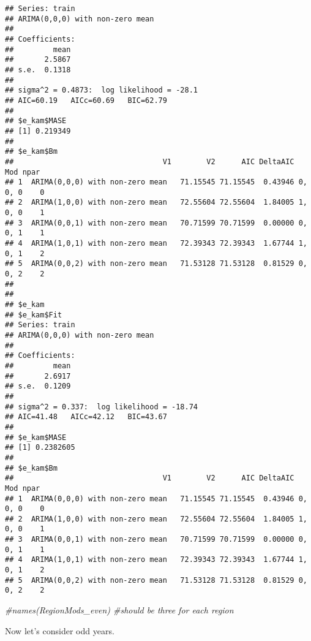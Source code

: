 \documentclass[
]{article}
\newenvironment{Shaded}{\begin{snugshade}}{\end{snugshade}}
\newcommand{\AttributeTok}[1]{\textcolor[rgb]{0.77,0.63,0.00}{#1}}
\newcommand{\CommentTok}[1]{\textcolor[rgb]{0.56,0.35,0.01}{\textit{#1}}}
\newcommand{\ConstantTok}[1]{\textcolor[rgb]{0.00,0.00,0.00}{#1}}
\newcommand{\FunctionTok}[1]{\textcolor[rgb]{0.00,0.00,0.00}{#1}}
\newcommand{\NormalTok}[1]{#1}
\newcommand{\OtherTok}[1]{\textcolor[rgb]{0.56,0.35,0.01}{#1}}
\newcommand{\SpecialCharTok}[1]{\textcolor[rgb]{0.00,0.00,0.00}{#1}}
\begin{document}
\begin{verbatim}
## Series: train 
## ARIMA(0,0,0) with non-zero mean 
## 
## Coefficients:
##         mean
##       2.5867
## s.e.  0.1318
## 
## sigma^2 = 0.4873:  log likelihood = -28.1
## AIC=60.19   AICc=60.69   BIC=62.79
## 
## $e_kam$MASE
## [1] 0.219349
## 
## $e_kam$Bm
##                                  V1        V2      AIC DeltaAIC     Mod npar
## 1  ARIMA(0,0,0) with non-zero mean   71.15545 71.15545  0.43946 0, 0, 0    0
## 2  ARIMA(1,0,0) with non-zero mean   72.55604 72.55604  1.84005 1, 0, 0    1
## 3  ARIMA(0,0,1) with non-zero mean   70.71599 70.71599  0.00000 0, 0, 1    1
## 4  ARIMA(1,0,1) with non-zero mean   72.39343 72.39343  1.67744 1, 0, 1    2
## 5  ARIMA(0,0,2) with non-zero mean   71.53128 71.53128  0.81529 0, 0, 2    2
## 
## 
## $e_kam
## $e_kam$Fit
## Series: train 
## ARIMA(0,0,0) with non-zero mean 
## 
## Coefficients:
##         mean
##       2.6917
## s.e.  0.1209
## 
## sigma^2 = 0.337:  log likelihood = -18.74
## AIC=41.48   AICc=42.12   BIC=43.67
## 
## $e_kam$MASE
## [1] 0.2382605
## 
## $e_kam$Bm
##                                  V1        V2      AIC DeltaAIC     Mod npar
## 1  ARIMA(0,0,0) with non-zero mean   71.15545 71.15545  0.43946 0, 0, 0    0
## 2  ARIMA(1,0,0) with non-zero mean   72.55604 72.55604  1.84005 1, 0, 0    1
## 3  ARIMA(0,0,1) with non-zero mean   70.71599 70.71599  0.00000 0, 0, 1    1
## 4  ARIMA(1,0,1) with non-zero mean   72.39343 72.39343  1.67744 1, 0, 1    2
## 5  ARIMA(0,0,2) with non-zero mean   71.53128 71.53128  0.81529 0, 0, 2    2
\end{verbatim}

\begin{Shaded}
\begin{Highlighting}[]
\CommentTok{\#names(RegionMods\_even) \#should be three for each region}
\end{Highlighting}
\end{Shaded}

Now let's consider odd years.

\begin{Shaded}
\end{Shaded}
\end{document}
